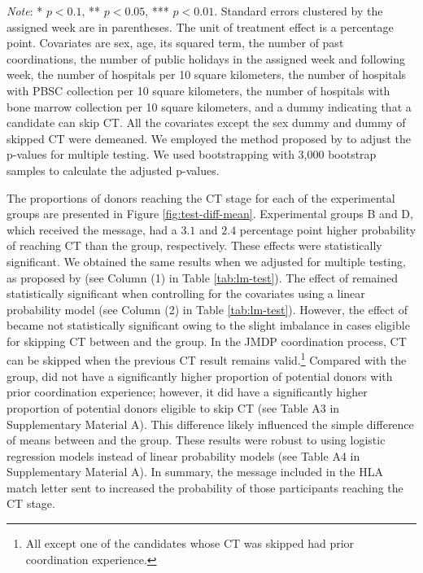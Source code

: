 \documentclass[12pt, a4paper]{article}
\newcommand{\revise}[1]{{\color{red}{#1}}}
\begin{document}
\begin{table}
\begin{threeparttable}
\begin{tablenotes}
\item \emph{Note}: * $p < 0.1$, ** $p < 0.05$, *** $p < 0.01$. Standard errors clustered by the assigned week are in parentheses. The unit of treatment effect is a percentage point. Covariates are sex, age, its squared term, the number of past coordinations, the number of public holidays in the assigned week and following week, the number of hospitals per 10 square kilometers, the number of hospitals with PBSC collection per 10 square kilometers, the number of hospitals with bone marrow collection per 10 square kilometers, and a dummy indicating that a candidate can skip CT. All the covariates except the sex dummy and dummy of skipped CT were demeaned. We employed the method proposed by \citet{List2019} to adjust the p-values for multiple testing. We used bootstrapping with 3,000 bootstrap samples to calculate the adjusted p-values.
\end{tablenotes}
\end{threeparttable}
\end{table}

The proportions of donors reaching the CT stage for each of the experimental groups are presented in Figure \ref{fig:test-diff-mean}. Experimental groups B and D, which received the \revise{matching difficulty} message, had a \(3.1\) and \(2.4\) percentage point higher probability of reaching CT than the \revise{StatusQuo} group, respectively. These effects were statistically significant. We obtained the same results when we adjusted for multiple \revise{hypotheses} testing, as proposed by \citet{List2019} (see Column (1) in Table \ref{tab:lm-test}). The effect of \revise{the MatchMessage group} remained statistically significant when controlling for the covariates using a linear probability model (see Column (2) in Table \ref{tab:lm-test}). However, the effect of \revise{the BothMessage group} became not statistically significant owing to the slight imbalance in cases eligible for skipping CT between \revise{the BothMessage group} and the \revise{StatusQuo} group. In the JMDP coordination process, CT can be skipped when the previous CT result remains valid.\footnote{All except one of the candidates whose CT was skipped had prior coordination experience.} Compared with the \revise{StatusQuo} group, \revise{the BothMessage group} did not have a significantly higher proportion of potential donors with prior coordination experience; however, it did have a significantly higher proportion of potential donors eligible to skip CT (see Table A3 in Supplementary Material A). This difference likely influenced the simple difference of means between \revise{the BothMessage group} and the \revise{StatusQuo} group. These results were robust to using logistic regression models instead of linear probability models (see Table A4 in Supplementary Material A). In summary, the \revise{matching difficulty} message included in the HLA match letter sent to \revise{the MatchMessage group} increased the probability of those participants reaching the CT stage.
\end{document}
